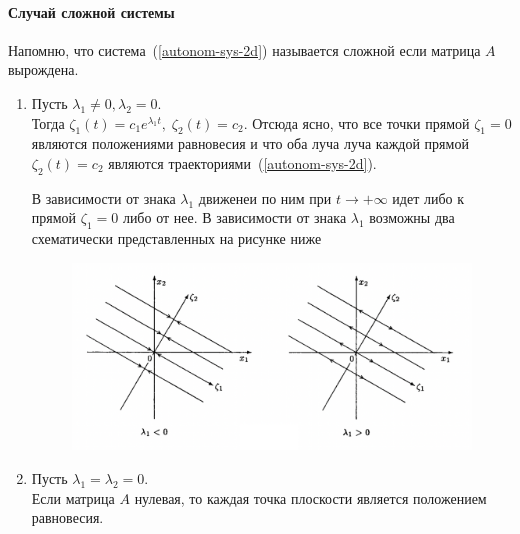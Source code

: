 \paragraph{Случай сложной системы}
Напомню, что система~(\ref{autonom-sys-2d}) называется сложной если матрица $A$ вырождена.

\begin{enumerate}[label=(\alph*)]
    \item Пусть $\lambda_1 \neq 0, \lambda_2 = 0$.\\
        Тогда \(\zeta_1(t) = c_1 e^{\lambda_1 t}, \;\zeta_2(t) = c_2\). Отсюда ясно, что все точки прямой $\zeta_1= 0$ являются положениями равновесия и что оба луча луча каждой прямой $\zeta_2(t) = c_2$ являются траекториями~(\ref{autonom-sys-2d}).
        
        В зависимости от знака $\lambda_1$ движенеи по ним при \(t \longrightarrow +\infty\) идет либо к прямой $\zeta_1= 0$ либо от нее. В зависимости от знака $\lambda_1$ возможны два схематически представленных на рисунке ниже
        \begin{figure}[H]\label{autonom-triviala}
            \centering
            \includegraphics[scale=0.6]{sections/Sasha/images/autonom-triviala.png}
            \caption{}
        \end{figure}
        
    \item Пусть $\lambda_1 = \lambda_2 = 0$.\\
        Если матрица $A$ нулевая,  то каждая точка плоскости является положением равновесия. 
        

\end{enumerate}
